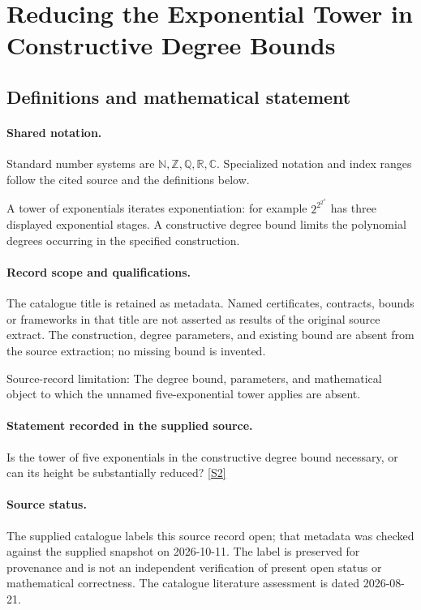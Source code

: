 \documentclass[11pt]{article}
\newcommand{\sref}[2]{\hyperlink{source:#1:#2}{[S#2]}}
\begin{document}
\section{Reducing the Exponential Tower in Constructive Degree Bounds}\label{statement}

\subsection{Definitions and mathematical statement}

\paragraph{Shared notation.}Standard number systems are $\mathbb N,\mathbb Z,\mathbb Q,\mathbb R,\mathbb C$. Specialized notation and index ranges follow the cited source and the definitions below.


A tower of exponentials iterates exponentiation: for example $2^{2^{2^x}}$ has three displayed exponential stages. A constructive degree bound limits the polynomial degrees occurring in the specified construction.
\paragraph{Record scope and qualifications.}
The catalogue title is retained as metadata. Named certificates, contracts, bounds or frameworks in that title are not asserted as results of the original source extract.
The construction, degree parameters, and existing bound are absent from the source extraction; no missing bound is invented.

Source-record limitation: The degree bound, parameters, and mathematical object to which the unnamed five-exponential tower applies are absent.
\paragraph{Statement recorded in the supplied source.}
Is the tower of five exponentials in the constructive degree bound necessary, or can its height be substantially reduced? \sref{statement}{2}
\paragraph{Source status.}
The supplied catalogue labels this source record open; that metadata was checked against the supplied snapshot on 2026-10-11. The label is preserved for provenance and is not an independent verification of present open status or mathematical correctness. The catalogue literature assessment is dated 2026-08-21.
\end{document}
